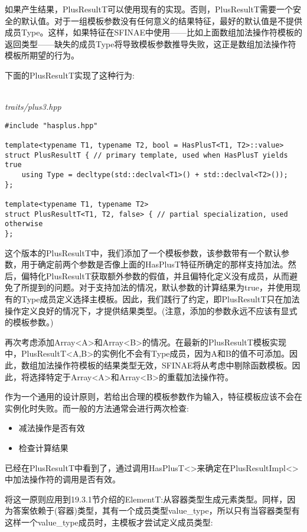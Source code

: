 如果产生结果，PlusResultT可以使用现有的实现。否则，PlusResultT需要一个安全的默认值。对于一组模板参数没有任何意义的结果特征，最好的默认值是不提供成员Type。这样，如果特征在SFINAE中使用——比如上面数组加法操作符模板的返回类型——缺失的成员Type将导致模板参数推导失败，这正是数组加法操作符模板所期望的行为。

下面的PlusResultT实现了这种行为:

\hspace*{\fill} \\ %
\noindent
\textit{traits/plus3.hpp}
\begin{lstlisting}[style=styleCXX]
#include "hasplus.hpp"

template<typename T1, typename T2, bool = HasPlusT<T1, T2>::value>
struct PlusResultT { // primary template, used when HasPlusT yields true
	using Type = decltype(std::declval<T1>() + std::declval<T2>());
};

template<typename T1, typename T2>
struct PlusResultT<T1, T2, false> { // partial specialization, used otherwise
};
\end{lstlisting}

这个版本的PlusResultT中，我们添加了一个模板参数，该参数带有一个默认参数，用于确定前两个参数是否像上面的HasPlusT特征所确定的那样支持加法。然后，偏特化PlusResultT获取额外参数的假值，并且偏特化定义没有成员，从而避免了所提到的问题。对于支持加法的情况，默认参数的计算结果为true，并使用现有的Type成员定义选择主模板。因此，我们践行了约定，即PlusResultT只在加法操作定义良好的情况下，才提供结果类型。(注意，添加的参数永远不应该有显式的模板参数。)

再次考虑添加Array<A>和Array<B>的情况。在最新的PlusResultT模板实现中，PlusResultT<A,B>的实例化不会有Type成员，因为A和B的值不可添加。因此，数组加法操作符模板的结果类型无效，SFINAE将从考虑中剔除函数模板。因此，将选择特定于Array<A>和Array<B>的重载加法操作符。

作为一个通用的设计原则，若给出合理的模板参数作为输入，特征模板应该不会在实例化时失败。而一般的方法通常会进行两次检查:

\begin{itemize}
\item
减法操作是否有效

\item
检查计算结果
\end{itemize}

已经在PlusResultT中看到了，通过调用HasPlusT<>来确定在PlusResultImpl<>中加法操作符的调用是否有效。

将这一原则应用到19.3.1节介绍的ElementT:从容器类型生成元素类型。同样，因为答案依赖于(容器)类型，其有一个成员类型value\_type，所以只有当容器类型有这样一个value\_type成员时，主模板才尝试定义成员类型:


